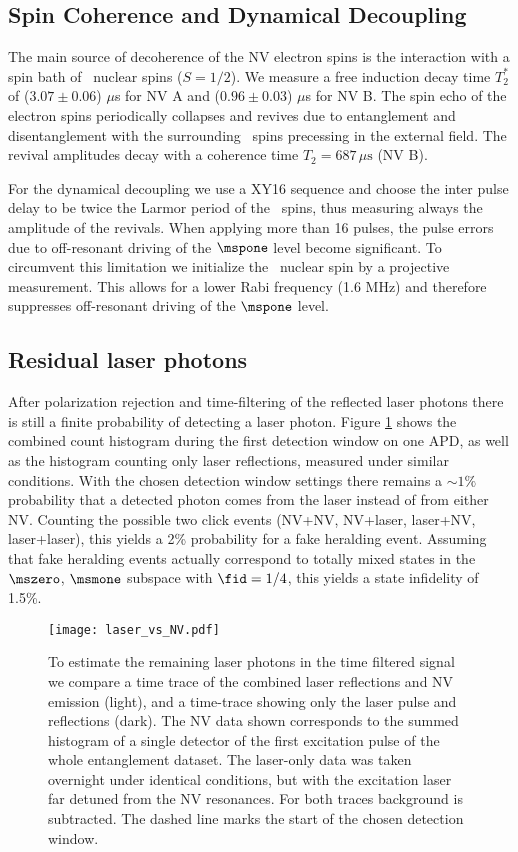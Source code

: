 \subsection{Spin Coherence and Dynamical Decoupling}
The main source of decoherence of the NV electron spins is the interaction with a spin bath of \cthirteen\ nuclear spins ($S = 1/2$). We measure a free induction decay time $T_2^{*}$ of ($3.07 \pm 0.06 $) $\mu$s for NV A and ($0.96 \pm 0.03$) $\mu$s for NV B. The spin echo of the electron spins periodically collapses and revives due to entanglement and disentanglement with the surrounding \cthirteen\ spins precessing in the external field\cite{Childress2006}. The revival amplitudes decay with a coherence time $T_2=687\,\mu\mathrm s$ (NV B).

For the dynamical decoupling we use a XY16 sequence\cite{Gullion:1990uj} and choose the inter pulse delay to be twice the Larmor period of the \cthirteen\ spins, thus measuring always the amplitude of the revivals. When applying more than 16 pulses, the pulse errors due to off-resonant driving of the $\mspone$ level become significant. To circumvent this limitation we initialize the \nfourteen\ nuclear spin by a projective measurement\cite{Robledo:2011fs}. This allows for a lower Rabi frequency (1.6 MHz) and therefore suppresses off-resonant driving of the $\mspone$ level.

\subsection{Residual laser photons}
After polarization rejection and time-filtering of the reflected laser photons there is still a finite probability of detecting a laser photon. Figure \ref{fig:laser_vs_nv} shows the combined count histogram during the first detection window on one APD, as well as the histogram counting only laser reflections, measured under similar conditions. With the chosen detection window settings there remains a $\sim 1\%$ probability that a detected photon comes from the laser instead of from either NV. Counting the possible two click events (NV+NV, NV+laser, laser+NV, laser+laser), this yields a 2\% probability for a fake heralding event. Assuming that fake heralding events actually correspond to totally mixed states in the $\mszero$, $\msmone$ subspace with $\fid=1/4$, this yields a state infidelity of 1.5\%.

\begin{figure}[h]
\centering
\texttt{[image: laser\_vs\_NV.pdf]}
\caption{To estimate the remaining laser photons in the time filtered signal we compare a time trace of the combined laser reflections and NV emission (light), and a time-trace showing only the laser pulse and reflections (dark). The NV data shown corresponds to the summed histogram of a single detector of the first excitation pulse of the whole entanglement dataset. The laser-only data was taken overnight under identical conditions, but with the excitation laser far detuned from the NV resonances. For both traces background is subtracted. The dashed line marks the start of the chosen detection window.}
\label{fig:laser_vs_nv}
\end{figure}


